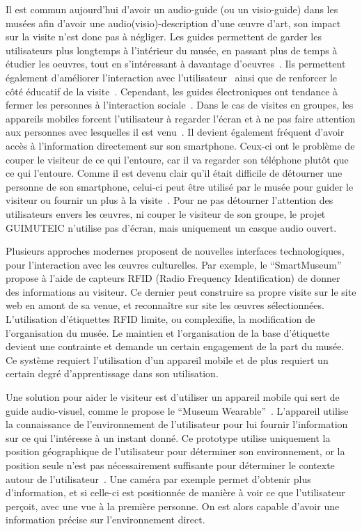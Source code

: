 Il est commun aujourd'hui d'avoir un audio-guide (ou un visio-guide) dans les musées afin d'avoir une audio(visio)-description d'une œuvre d'art, son impact sur la visite n'est donc pas à négliger.
Les guides permettent de garder les utilisateurs plus longtemps à l'intérieur du musée, en passant plus de temps à étudier les oeuvres, tout en s'intéressant à davantage d'oeuvres~\cite{lanir2013influence}. 
Ils permettent également d'améliorer l'interaction avec l'utilisateur~\cite{evans1999portable} ainsi que de renforcer le côté éducatif de la visite~\cite{woodruff2002eavesdropping}.
Cependant, les guides électroniques ont tendance à fermer les personnes à l'interaction sociale~\cite{angliss2006talking}. Dans le cas de visites en groupes, les appareils mobiles forcent l'utilisateur à regarder l'écran et à ne pas faire attention aux personnes avec lesquelles il est venu~\cite{grinter2002revisiting, petrelli2005user}.
Il devient également fréquent d'avoir accès à l'information directement sur son smartphone.
Ceux-ci ont le problème de couper le visiteur de ce qui l'entoure, car il va regarder son téléphone plutôt que ce qui l'entoure. Comme il est devenu clair qu'il était difficile de détourner une personne de son smartphone, celui-ci peut être utilisé par le musée pour guider le visiteur ou fournir un plus à la visite~\cite{gammon2008designing, pierroux2011bridging, weilenmann2013instagram}.
Pour ne pas détourner l'attention des utilisateurs envers les œuvres, ni couper le visiteur de son groupe, le projet GUIMUTEIC n'utilise pas d'écran, mais uniquement un casque audio ouvert.

Plusieurs approches modernes proposent de nouvelles interfaces technologiques, pour l'interaction avec les œuvres culturelles.
Par exemple, le ``SmartMuseum''~\cite{kuusik2009smartmuseum} propose à l'aide de capteurs RFID (Radio Frequency Identification) de donner des informations au visiteur. 
Ce dernier peut construire sa propre visite sur le site web en amont de sa venue, et reconnaître sur site les œuvres sélectionnées.
L'utilisation d'étiquettes RFID limite, ou complexifie, la modification de l'organisation du musée. Le maintien et l'organisation de la base d'étiquette devient une contrainte et demande un certain engagement de la part du musée. 
Ce système requiert l'utilisation d'un appareil mobile et de plus requiert un certain degré d'apprentissage dans son utilisation.

Une solution pour aider le visiteur est d'utiliser un appareil mobile qui sert de guide audio-visuel, comme le propose le ``Museum Wearable''~\cite{sparacino2002museum}. L'appareil utilise la connaissance de l'environnement de l'utilisateur pour lui fournir l'information sur ce qui l'intéresse à un instant donné. Ce prototype utilise uniquement la position géographique de l'utilisateur pour déterminer son environnement, or la position seule n'est pas nécessairement suffisante pour déterminer le contexte autour de l'utilisateur~\cite{schmidt1999there}.
Une caméra par exemple permet d'obtenir plus d'information, et si celle-ci est positionnée de manière à voir ce que l'utilisateur perçoit, avec une vue à la première personne. On est alors capable d'avoir une information précise sur l'environnement direct.

